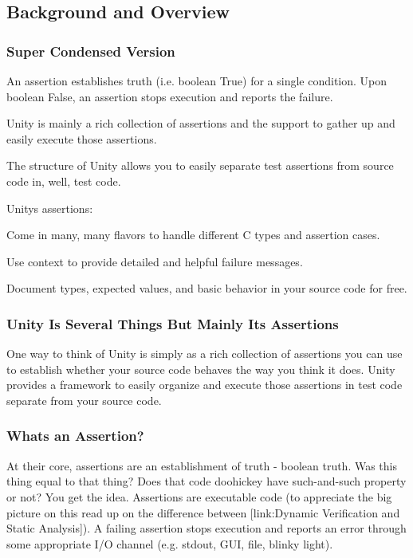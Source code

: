 \subsection*{Background and Overview}

\subsubsection*{Super Condensed Version}


\begin{DoxyItemize}
\item An assertion establishes truth (i.\+e. boolean True) for a single condition. Upon boolean False, an assertion stops execution and reports the failure.
\item Unity is mainly a rich collection of assertions and the support to gather up and easily execute those assertions.
\item The structure of Unity allows you to easily separate test assertions from source code in, well, test code.
\item Unity\textquotesingle{}s assertions\+:
\item Come in many, many flavors to handle different C types and assertion cases.
\item Use context to provide detailed and helpful failure messages.
\item Document types, expected values, and basic behavior in your source code for free.
\end{DoxyItemize}

\subsubsection*{Unity Is Several Things But Mainly It\textquotesingle{}s Assertions}

One way to think of Unity is simply as a rich collection of assertions you can use to establish whether your source code behaves the way you think it does. Unity provides a framework to easily organize and execute those assertions in test code separate from your source code.

\subsubsection*{What\textquotesingle{}s an Assertion?}

At their core, assertions are an establishment of truth -\/ boolean truth. Was this thing equal to that thing? Does that code doohickey have such-\/and-\/such property or not? You get the idea. Assertions are executable code (to appreciate the big picture on this read up on the difference between \mbox{[}link\+:Dynamic Verification and Static Analysis\mbox{]}). A failing assertion stops execution and reports an error through some appropriate I/O channel (e.\+g. stdout, G\+UI, file, blinky light).

